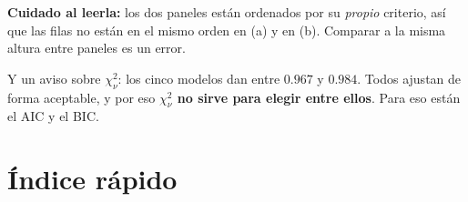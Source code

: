 \documentclass[11pt,a4paper]{article}
\newcommand{\Al}[1]{\textcolor{alarma}{\textbf{#1}}}
\begin{document}
\medskip\noindent
\Al{Cuidado al leerla:} los dos paneles están ordenados por su \emph{propio}
criterio, así que las filas no están en el mismo orden en (a) y en (b).
Comparar a la misma altura entre paneles es un error.

\medskip\noindent
Y un aviso sobre $\chi^2_\nu$: los cinco modelos dan entre $0.967$ y $0.984$.
Todos ajustan de forma aceptable, y por eso \textbf{$\chi^2_\nu$ no sirve
para elegir entre ellos}. Para eso están el AIC y el BIC.

\clearpage
\section{Índice rápido}
\end{document}
